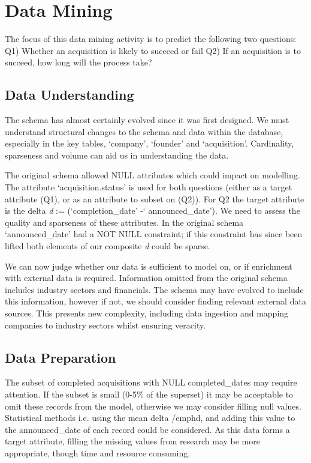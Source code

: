 \documentclass[12pt]{article}
\begin{document}
\section {Data Mining}

The focus of this data mining activity is to predict the following two questions: Q1) Whether an acquisition is likely to succeed or fail Q2) If an acquisition is to succeed, how long will the process take?

 \subsection{Data Understanding}
The schema has almost certainly evolved since it was first designed. We must understand structural changes to the schema and data within the database, especially in the key tables, `company', `founder' and `acquisition'. Cardinality, sparseness and volume can aid us in understanding the data.

The original schema allowed NULL attributes which could impact on modelling. The attribute `acquisition.status' is used for both questions (either as a target attribute (Q1), or as an attribute to subset on (Q2)). For Q2 the target attribute is the delta \emph{d} := (`completion\_date' -` announced\_date').  We need to assess the quality and sparseness of these attributes. In the original schema `announced\_date' had a NOT NULL constraint; if this constraint has since been lifted both elements of our composite \emph{d} could be sparse.

We can now judge whether our data is sufficient to model on, or if enrichment with external data is required. Information omitted from the original schema includes industry sectors and financials. The schema may have evolved to include this information, however if not, we should consider finding relevant external data sources. This presents new complexity, including data ingestion and mapping companies to industry sectors whilst ensuring veracity.

 \subsection{Data Preparation}
The subset of completed acquisitions with NULL completed\_dates may require attention. If the subset is small (0-5\% of the superset) it may be acceptable to omit these records from the model, otherwise we may consider filling null values. Statistical methods i.e. using the mean delta /emph{d}, and adding this value to the announced\_date of each record could be considered. As this data forms a target attribute, filling the missing values from research may be more appropriate, though time and resource consuming.
\end{document}
